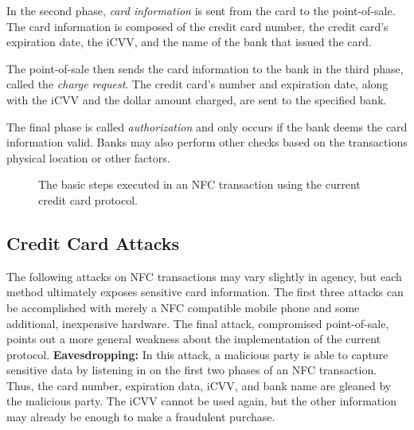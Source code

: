 \documentclass{sig-alternate}
\begin{document}
In the second phase, \textit{card information} is sent from the card to the point-of-sale. The card information is composed of the credit card number, the credit card's expiration date, the iCVV, and the name of the bank that issued the card.

The point-of-sale then sends the card information to the bank in the third phase, called the \textit{charge request}. The credit card's number and expiration date, along with the iCVV and the dollar amount charged, are sent to the specified bank.

The final phase is called \textit{authorization} and only occurs if the bank deems the card information valid. Banks may also perform other checks based on the transactions physical location or other factors.


\begin{figure}
\centering
{}
\caption{The basic steps executed in an NFC transaction using the current credit card protocol.
\cite{CC2016}}
\label{fig:currentCC}
\end{figure}

\subsection{Credit Card Attacks}
\label{sec:attacks}
The following attacks on NFC transactions may vary slightly in agency, but each method ultimately exposes sensitive card information. The first three attacks can be accomplished with merely a NFC compatible mobile phone and some additional, inexpensive hardware. The final attack, compromised point-of-sale, points out a more general weakness about the implementation of the current protocol.
\vspace{2mm}\newline
\noindent\textbf{Eavesdropping:}
In this attack, a malicious party is able to capture sensitive data by listening in on the first two phases of an NFC transaction. Thus, the card number, expiration data, iCVV, and bank name are gleaned by the malicious party. The iCVV cannot be used again, but the other information may already be enough to make a fraudulent purchase.
\end{document}
